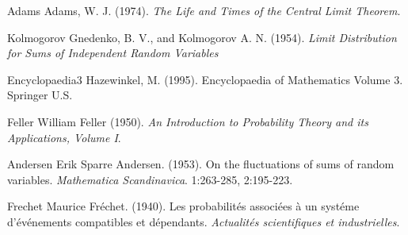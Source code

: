 \documentclass[uplatex,dvipdfmx]{jsreport}
\begin{document}
\begin{thebibliography}{99}
    \item{Adams}
    Adams, W. J. (1974). \textit{The Life and Times of the  Central Limit Theorem}.
    \item{Kolmogorov}
    Gnedenko, B. V., and Kolmogorov A. N. (1954). \textit{Limit Distribution for Sums of Independent Random Variables}
    \item{Encyclopaedia3}
    Hazewinkel, M. (1995). Encyclopaedia of Mathematics Volume 3. Springer U.S.
    \item{Feller}
    William Feller (1950). \textit{An Introduction to Probability Theory and its Applications, Volume I}.
    \item{Andersen}
    Erik Sparre Andersen. (1953). On the fluctuations of sums of random variables. \textit{Mathematica Scandinavica}. 1:263-285, 2:195-223.
    \item{Frechet}
    Maurice Fréchet. (1940). Les probabilités associées à un systéme d'événements compatibles et dépendants. \textit{Actualités scientifiques et industrielles}.
\end{thebibliography}
\end{document}
